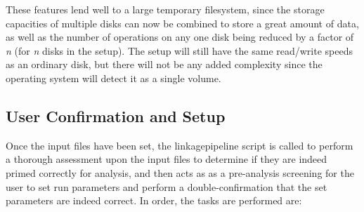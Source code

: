These features lend well to a large temporary filesystem, since the storage capacities of multiple disks can now be combined to store a great amount of data, as well as the number of operations on any one disk being reduced by a factor of \textit{n} (for \textit{n} disks in the setup). The setup will still have the same read/write speeds as an ordinary disk, but there will not be any added complexity since the operating system will detect it as a single volume.

\subsection{User Confirmation and Setup}

Once the input files have been set, the \gls{linkagepipeline} script is called to perform a thorough assessment upon the input files to determine if they are indeed primed correctly for analysis, and then acts as as a pre-analysis screening for the user to set run parameters and perform a double-confirmation that the set parameters are indeed correct. In order, the tasks are performed are:

